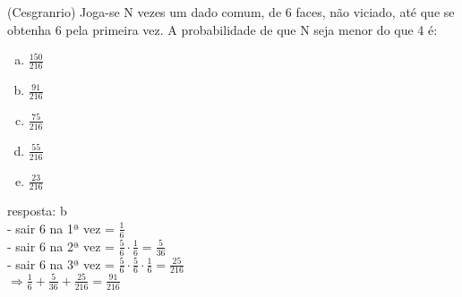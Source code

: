 \begin{ex}
 (Cesgranrio) Joga-se N vezes um dado comum, de 6 faces, não viciado, até que se obtenha 6 pela primeira vez. A probabilidade de que N seja menor do que 4 é: 
    \begin{enumerate}[(a)]
    \item $\frac{150}{216}$
    \item $\frac{91}{216}$
    \item $\frac{75}{216}$
    \item $\frac{55}{216}$
    \item $\frac{23}{216}$
    \end{enumerate}
      \begin{sol}
        resposta: b \\
        - sair 6 na 1ª vez = $\frac{1}{6}$ \\
        - sair 6 na 2ª vez = $\frac{5}{6}\cdot\frac{1}{6}=\frac{5}{36}$ \\
        - sair 6 na 3ª vez = $\frac{5}{6}\cdot\frac{5}{6}\cdot\frac{1}{6}=\frac{25}{216}$  \\
        $\Longrightarrow \frac{1}{6}+\frac{5}{36}+\frac{25}{216}=\frac{91}{216}$
      \end{sol}
\end{ex}